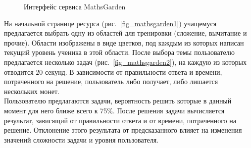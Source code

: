 \documentclass[14pt]{matmex-diploma}
\begin{document}
\begin{figure}[t]
  \centering
  \hfill
  \caption{Интерфейс сервиса MathsGarden}
  
\end{figure}

\indent На начальной странице ресурса (рис.~\ref{fig_mathsgarden1}) учащемуся предлагается выбрать одну из областей для тренировки (сложение, вычитание и прочие). Области изображены в виде цветков, под каждым из которых написан текущий уровень ученика в этой области. После выбора темы пользователю предлагается несколько задач (рис.~\ref{fig_mathsgarden2}), на каждую из которых отводится $20$ секунд. В зависимости от правильности ответа и времени, потраченного на решение, пользователь либо получает, либо лишается нескольких монет.
\\\indent Пользователю предлагаются задачи, вероятность решить которые в данный момент для него ближе всего к 75\%. После решения задачи вычисляется результат, зависящий от правильности ответа и от времени, потраченного на решение. Отклонение этого результата от предсказанного влияет на изменения значений сложности задачи и уровня пользователя.
\end{document}
